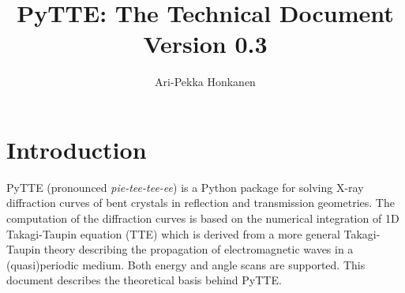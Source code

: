 \documentclass[11pt,a4paper]{article}
\author{Ari-Pekka Honkanen}
\title{PyTTE: The Technical Document\\Version 0.3}
\begin{document}
\maketitle
\section{Introduction}
PyTTE (pronounced \emph{pie-tee-tee-ee}) is a Python package for solving X-ray diffraction curves of bent crystals in reflection and transmission geometries. The computation of the diffraction curves is based on the numerical integration of 1D Takagi-Taupin equation (TTE) which is derived from a more general Takagi-Taupin theory describing the propagation of electromagnetic waves in a (quasi)periodic medium. Both energy and angle scans are supported.
This document describes the theoretical basis behind PyTTE.
\end{document}
